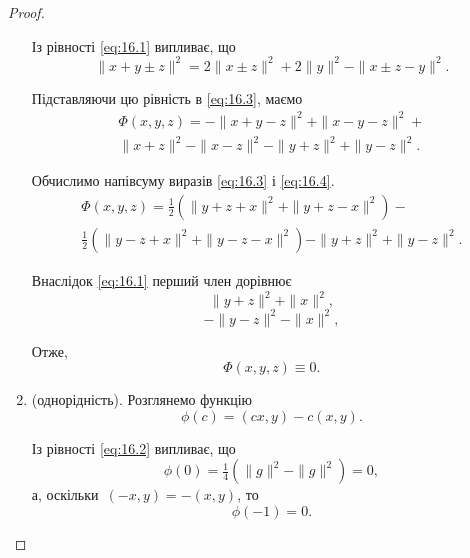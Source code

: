 \begin{proof}
\begin{enumerate}
        Із рівності \eqref{eq:16.1} випливає, що
        \begin{equation*}
            \|x + y \pm z\|^2 = 2 \|x \pm z\|^2 + 2 \|y\|^2 - \|x \pm z - y\|^2.
        \end{equation*}
        
        Підставляючи цю рівність в \eqref{eq:16.3}, маємо
        \begin{multline}
            \label{eq:16.4}
            \Phi(x, y, z) = -\|x + y - z\|^2 + \|x - y - z\|^2 + \\
            \|x + z\|^2 - \|x - z\|^2 - \|y + z\|^2 + \|y - z\|^2.
        \end{multline}
        
        Обчислимо напівсуму виразів \eqref{eq:16.3} і \eqref{eq:16.4}.
        \begin{multline*}
            \Phi(x, y, z) = \tfrac{1}{2} (\|y + z + x\|^2 + \|y + z - x\|^2) - \\
            \tfrac{1}{2} (\|y - z + x\|^2 + \|y - z - x\|^2) - \|y + z\|^2 + \|y - z\|^2.
        \end{multline*}
        
        Внаслідок \eqref{eq:16.1} перший член дорівнює
        \begin{equation*}
            \|y + z\|^2 + \|x\|^2,
        \end{equation*}
        \begin{equation*}
            -\|y - z\|^2 - \|x\|^2,
        \end{equation*}
        
        Отже,
        \begin{equation*}
            \Phi(x, y, z) \equiv 0.
        \end{equation*}
        
        \item (однорідність). Розглянемо функцію
        \begin{equation*}
            \phi(c) = (c x, y) - c (x, y).
        \end{equation*}
        
        Із рівності \eqref{eq:16.2} випливає, що
        \begin{equation*}
            \phi(0) = \tfrac{1}{4} (\|g\|^2 - \|g\|^2) = 0,
        \end{equation*}
        а, оскільки~$(-x, y) = -(x, y)$, то
        \begin{equation*}
            \phi(-1) = 0.
        \end{equation*}
        

\end{enumerate}
\end{proof}
